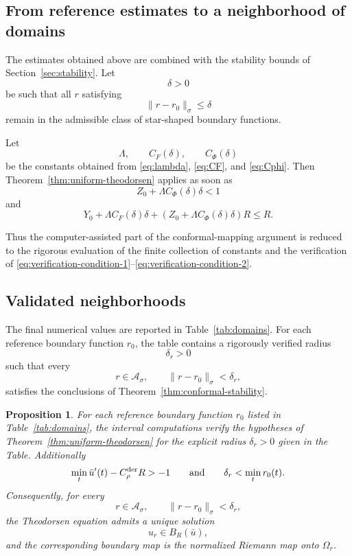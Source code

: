 \documentclass[11pt,a4paper]{amsart}
\newtheorem{proposition}[theorem]{Proposition}
\begin{document}
\subsection{From reference estimates to a neighborhood of domains}

The estimates obtained above are combined with the stability bounds
of Section~\ref{sec:stability}. Let
\[
\delta>0
\]
be such that all $r$ satisfying
\[
\|r-r_0\|_\sigma\le\delta
\]
remain in the admissible class of star-shaped boundary functions.

Let
\[
\Lambda,\qquad
C_F(\delta),
\qquad
C_\Phi(\delta)
\]
be the constants obtained from
\eqref{eq:lambda}, \eqref{eq:CF}, and \eqref{eq:Cphi}. Then
Theorem~\ref{thm:uniform-theodorsen} applies as soon as
\begin{equation}\label{eq:verification-condition-1}
	Z_0+\Lambda C_\Phi(\delta)\delta<1
\end{equation}
and
\begin{equation}\label{eq:verification-condition-2}
	Y_0
	+
	\Lambda C_F(\delta)\delta
	+
	\left(
	Z_0
	+
	\Lambda C_\Phi(\delta)\delta
	\right)R
	\le
	R.
\end{equation}

Thus the computer-assisted part of the conformal-mapping argument is
reduced to the rigorous evaluation of the finite collection of
constants and the verification of
\eqref{eq:verification-condition-1}--\eqref{eq:verification-condition-2}.


\subsection{Validated neighborhoods}

The final numerical values are reported in
Table~\ref{tab:domains}. For each reference boundary function $r_0$,
the table contains a rigorously verified radius
\[
\delta_r>0
\]
such that every
\[
r\in\mathcal A_\sigma,
\qquad
\|r-r_0\|_\sigma<\delta_r,
\]
satisfies the conclusions of
Theorem~\ref{thm:conformal-stability}.

\begin{proposition}\label{prop:validated-neighborhoods}
	For each reference boundary function $r_0$ listed in
	Table~\ref{tab:domains}, the interval computations verify the hypotheses of Theorem~\ref{thm:uniform-theodorsen} for the explicit radius $\delta_r>0$ given in the Table. Additionally
	$$
	\min_t \bar u'(t)-C_{\rho}^{\rm der}R>-1\qquad\text{and}\qquad
	\delta_r<\min_t r_0(t).
	$$	
	Consequently, for every
	\[
	r\in\mathcal A_\sigma,
	\qquad
	\|r-r_0\|_\sigma<\delta_r,
	\]
	the Theodorsen equation admits a unique solution
	\[
	u_r\in B_R(\bar u),
	\]
	and the corresponding boundary map is the normalized Riemann map onto
	$\Omega_r$.
\end{proposition}
\end{document}
